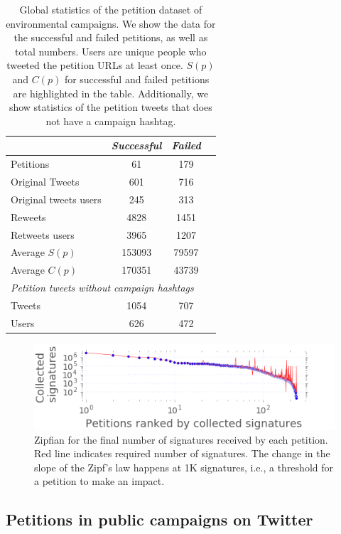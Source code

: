 \begin{table}[hbt!]
\centering
\begin{tabular}{lccc}
			& \textit{Successful} & \textit{Failed}	\\ \midrule
Petitions					& 61		& 179		\\
Original Tweets				& 601		& 716		\\
Original tweets users 		& 245		& 313		\\
Reweets						& 4828		& 1451 		\\
Retweets users				& 3965		& 1207		\\
Average $S(p)$				& 153093	& 79597		\\
Average $C(p)$				& 170351	& 43739		\\
\multicolumn{3}{l}{\textit{Petition tweets without campaign hashtags}}	\\ \midrule
Tweets						& 1054		& 707		\\
Users 						& 626		& 472		\\
\end{tabular}
\caption{Global statistics of the petition dataset of environmental campaigns. We show the data for the successful and failed petitions, as well as total numbers. Users are unique people who tweeted the petition URLs at least once. $S(p)$ and $C(p)$ for successful and failed petitions are highlighted in the table. Additionally, we show statistics of the petition tweets that does not have a campaign hashtag.}
\label{tab:petition_tweets}
\end{table}

\begin{figure}
\centering
\includegraphics[scale=0.47]{figures/petitionsVSrank.png}
\caption{Zipfian for the final number of signatures received by each petition. Red line indicates required number of signatures. The change in the slope of the Zipf's law happens at 1K signatures, i.e., a threshold for a petition to make an impact.}
\label{fig:signatures_vs_rank}
\end{figure}

\subsection{Petitions in public campaigns on Twitter}

